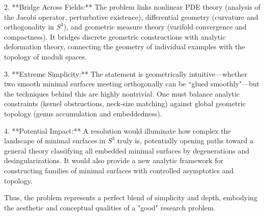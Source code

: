 2. **Bridge Across Fields:**  
The problem links nonlinear PDE theory (analysis of the Jacobi operator, perturbative existence), differential geometry (curvature and orthogonality in $S^3$), and geometric measure theory (varifold convergence and compactness). It bridges discrete geometric constructions with analytic deformation theory, connecting the geometry of individual examples with the topology of moduli spaces.

3. **Extreme Simplicity:**  
The statement is geometrically intuitive—whether two smooth minimal surfaces meeting orthogonally can be “glued smoothly"—but the techniques behind this are highly nontrivial. One must balance analytic constraints (kernel obstructions, neck-size matching) against global geometric topology (genus accumulation and embeddedness).

4. **Potential Impact:**  
A resolution would illuminate how complex the landscape of minimal surfaces in $S^3$ truly is, potentially opening paths toward a general theory classifying all embedded minimal surfaces by degenerations and desingularizations. It would also provide a new analytic framework for constructing families of minimal surfaces with controlled asymptotics and topology.

Thus, the problem represents a perfect blend of simplicity and depth, embodying the aesthetic and conceptual qualities of a "good" research problem.